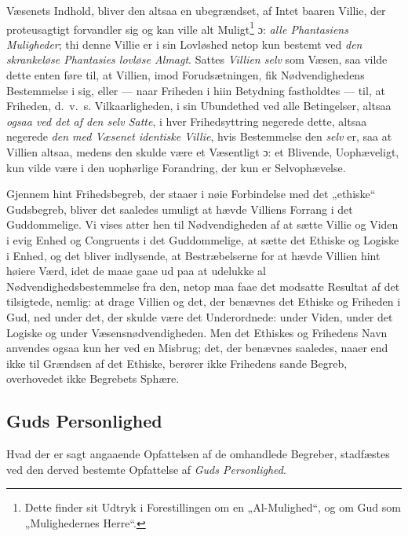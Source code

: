 \documentclass[12pt,a4paper]{book}
\newcommand{\opage}[1]{\marginnote{\footnotesize\textit{[#1]}}}
\begin{document}
Væsenets Indhold, bliver den altsaa en ubegrændset, af Intet baaren Villie, der
proteusagtigt forvandler sig og kan ville alt Muligt\footnote{Dette finder sit
Udtryk i Forestillingen om en „Al-Mulighed“, og om Gud som „Mulighedernes Herre“.}
ɔ: \emph{alle Phantasiens Mulig\opage{66}heder}; thi denne Villie er i sin Lovløshed netop
kun bestemt ved \emph{den skrankeløse Phantasies lovløse Almagt}. Sattes \emph{Villien selv} som
Væsen, saa vilde dette enten føre til, at Villien, imod Forudsætningen, fik
Nødvendighedens Bestemmelse i sig, eller --- naar Friheden i hiin Betydning
fastholdtes --- til, at Friheden, d.\ v.\ s. Vilkaarligheden, i sin Ubundethed ved
alle Betingelser, altsaa \emph{ogsaa ved det af den selv Satte}, i hver Frihedsyttring
negerede dette, altsaa negerede \emph{den med Væsenet identiske Villie}, hvis Bestemmelse den \emph{selv} er, saa at Villien altsaa, medens den skulde være et Væsentligt ɔ: et
Blivende, Uophæveligt, kun vilde være i den uophørlige Forandring, der kun er
Selvophævelse.

Gjennem hint Frihedsbegreb, der staaer i nøie Forbindelse med det „ethiske“
Gudsbegreb, bliver det saaledes umuligt at hævde Villiens Forrang i det
Guddommelige. Vi vises atter hen til Nødvendigheden af at sætte Villie og Viden i
evig Enhed og Congruents i det Guddommelige, at sætte det Ethiske og Logiske i
Enhed, og det bliver indlysende, at Bestræbelserne for at hævde Villien hint høiere
Værd, idet de maae gaae ud paa at udelukke al Nødvendighedsbestemmelse fra den,
netop maa faae det modsatte Resultat af det tilsigtede, nemlig: at drage Villien og
det, der benævnes det Ethiske og Friheden i Gud, ned under det, der skulde være det
Underordnede: under Viden, under det Logiske og under Væsensnødvendigheden. Men det
Ethiskes og Frihedens Navn anvendes ogsaa kun her ved en Misbrug; det, der benævnes
saaledes, naaer end ikke til Grændsen af det Ethiske, berører ikke Frihedens sande
Begreb, overhovedet ikke Begrebets Sphære.

\subsection{Guds Personlighed}
\label{ssec:guds-personlighed}

Hvad der er sagt angaaende Opfattelsen af de omhandlede Begreber, stadfæstes ved
den derved bestemte Opfattelse af \emph{Guds Personlighed}.
\end{document}
